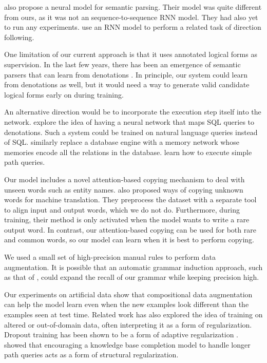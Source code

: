 \documentclass[11pt,letterpaper]{article}
\begin{document}
also propose a neural model for semantic parsing.
Their model was quite different from ours, as
it was not an sequence-to-sequence RNN model.
They had also yet to run any experiments.
 use an RNN model
to perform a related task of direction following.

One limitation of our current approach is that it 
uses annotated logical forms as supervision.
In the last few years, there has been an emergence of
semantic parsers that can learn from denotations 
\cite{clarke10world,liang11dcs,berant2013freebase,artzi2013weakly}.
In principle, our system could learn from denotations as well,
but it would need a way to generate valid candidate logical forms
early on during training.

An alternative direction would be to incorporate the execution
step itself into the network.  
explore the idea of having a neural network that maps
SQL queries to denotations.  Such a system could be trained
on natural language queries instead of SQL.
similarly replace a database engine with a memory network
whose memories encode all the relations in the database.
 learn how to execute simple path queries.

Our model includes a novel attention-based copying mechanism
to deal with unseen words such as entity names.
 also proposed ways of copying
unknown words for machine translation.
They preprocess the dataset
with a separate tool to align input and output words,
which we do not do.
Furthermore, during training, their method is only activated when the model
wants to write a rare output word. 
In contrast, our attention-based copying can be used for 
both rare and common words,
so our model can learn when it is best to perform copying.

We used a small set of high-precision manual rules to perform data augmentation.
It is possible that an automatic grammar induction approach,
such as that of ,
could expand the recall of our grammar while keeping precision high.

Our experiments on artificial data show that
compositional data augmentation can help the model learn
even when the new examples look different than the examples seen at test time.  
Related work has also explored the idea of training on 
altered or out-of-domain data, often interpreting
it as a form of regularization.
Dropout training has been shown to be a form of adaptive regularization
\cite{hinton2012improving,wager2014altitude}.
showed that encouraging a knowledge base completion model
to handle longer path queries 
acts as a form of structural regularization.
\end{document}
